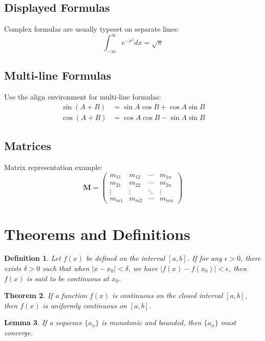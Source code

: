 \documentclass[12pt,a4paper]{article}
\newtheorem{theorem}{Theorem}[section]
\newtheorem{lemma}[theorem]{Lemma}
\newtheorem{definition}[theorem]{Definition}
\begin{document}
\subsection{Displayed Formulas}
Complex formulas are usually typeset on separate lines:
\begin{equation}
    \int_{-\infty}^{\infty} e^{-x^2} dx = \sqrt{\pi}
    \label{eq:gaussian}
\end{equation}

\subsection{Multi-line Formulas}
Use the align environment for multi-line formulas:
\begin{align}
    \sin(A+B) &= \sin A \cos B + \cos A \sin B \\
    \cos(A+B) &= \cos A \cos B - \sin A \sin B
\end{align}

\subsection{Matrices}
Matrix representation example:
\[
\mathbf{M} = \begin{pmatrix}
    m_{11} & m_{12} & \cdots & m_{1n} \\
    m_{21} & m_{22} & \cdots & m_{2n} \\
    \vdots & \vdots & \ddots & \vdots \\
    m_{m1} & m_{m2} & \cdots & m_{mn}
\end{pmatrix}
\]

\section{Theorems and Definitions}
\label{sec:theorems}

\begin{definition}
Let $f(x)$ be defined on the interval $[a,b]$. If for any $\epsilon > 0$, there exists $\delta > 0$ such that when $|x - x_0| < \delta$, we have $|f(x) - f(x_0)| < \epsilon$, then $f(x)$ is said to be continuous at $x_0$.
\end{definition}

\begin{theorem}
If a function $f(x)$ is continuous on the closed interval $[a,b]$, then $f(x)$ is uniformly continuous on $[a,b]$.
\end{theorem}

\begin{lemma}
If a sequence $\{a_n\}$ is monotonic and bounded, then $\{a_n\}$ must converge.
\end{lemma}
\end{document}

